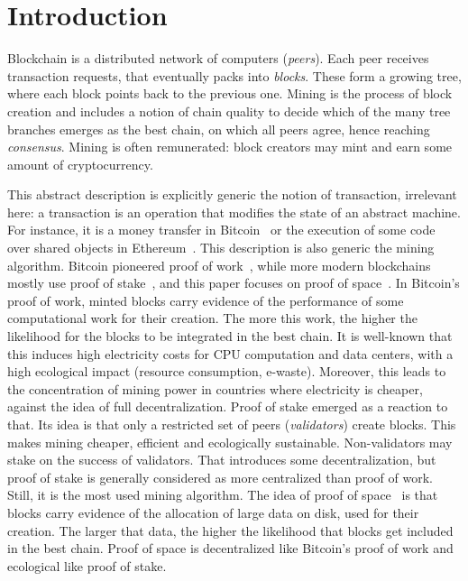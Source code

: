 \section{Introduction}\label{sec:introduction}

Blockchain is a distributed network of computers (\emph{peers}).
Each peer receives transaction requests, that eventually packs
into \emph{blocks}. These form a growing tree,
where each block points back to the previous one. Mining is the process of
block creation and includes a notion of chain quality to
decide which of the many tree branches emerges
as the best chain, on which all peers agree,
hence reaching \emph{consensus}. Mining
is often remunerated: block creators may
mint and earn some amount of cryptocurrency.

This abstract description is explicitly generic \wrt{}
the notion of transaction, irrelevant here: a transaction is an operation
that modifies the state of an abstract machine.
For instance, it is a money transfer in Bitcoin~\cite{Nakamoto08} or
the execution of some code over shared objects in Ethereum~\cite{AntonopoulosW25}.
This description is also generic \wrt{} the mining algorithm.
Bitcoin pioneered proof of work~\cite{DworkN92},
while more modern blockchains mostly use
proof of stake~\cite{Kwon14}, and this paper focuses on proof
of space~\cite{Spoto25}.
In Bitcoin's proof of work,
minted blocks carry evidence of the performance of some computational
work for their creation. The more this work, the higher the
likelihood for the blocks to be integrated in the best chain.
It is well-known that this induces high electricity costs for CPU
computation and data centers, with a high ecological impact (resource
consumption, e-waste). Moreover, this leads to the concentration of mining power
in countries where electricity is cheaper, against the idea of full decentralization.
Proof of stake emerged as a reaction to that. Its idea is that
only a restricted set of peers (\emph{validators}) create blocks.
This makes mining cheaper, efficient and ecologically sustainable.
Non-validators may stake on the success of validators. That introduces some
decentralization, but
proof of stake is generally considered as more centralized than proof of work.
Still, it is the most used mining algorithm.
The idea of proof of space~\cite{AbusalahACKPR17,AtenieseBFG14,CohenP19,DziembowskiFKP15,ParkKFGAP18,RenD16,Spoto25} is that blocks carry evidence
of the allocation of large data on disk, used for their creation.
The larger that data, the higher the likelihood that
blocks get included in the best chain. Proof of space is decentralized like
Bitcoin's proof of work and ecological like proof of stake.

